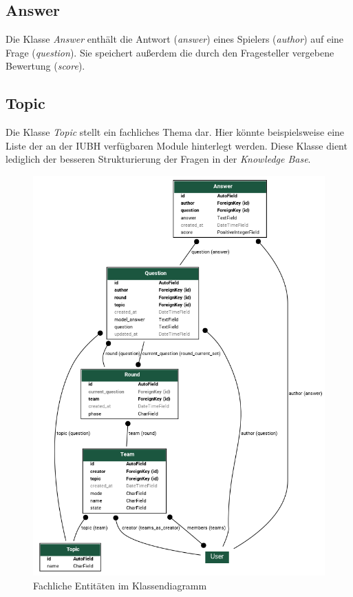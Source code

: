\documentclass[a4paper,11pt,listof=numbered,glossary=totoc,parskip=half,toc=bib]{scrreprt}
\begin{document}
	\subsection{Answer}
	Die Klasse \textit{Answer} enthält die Antwort (\textit{answer}) eines Spielers (\textit{author}) auf eine Frage (\textit{question}). Sie speichert außerdem die durch den Fragesteller vergebene Bewertung (\textit{score}).
	
	\subsection{Topic}
	Die Klasse \textit{Topic} stellt ein fachliches Thema dar. Hier könnte beispielsweise eine Liste der an der IUBH verfügbaren Module hinterlegt werden. Diese Klasse dient lediglich der besseren Strukturierung der Fragen in der \textit{Knowledge Base}.
	
	\begin{figure}
		\centering
		\includegraphics[width=\textwidth]{models.png}
		\caption{Fachliche Entitäten im Klassendiagramm}
		\label{fig:models}
	\end{figure}
	
\end{document}
